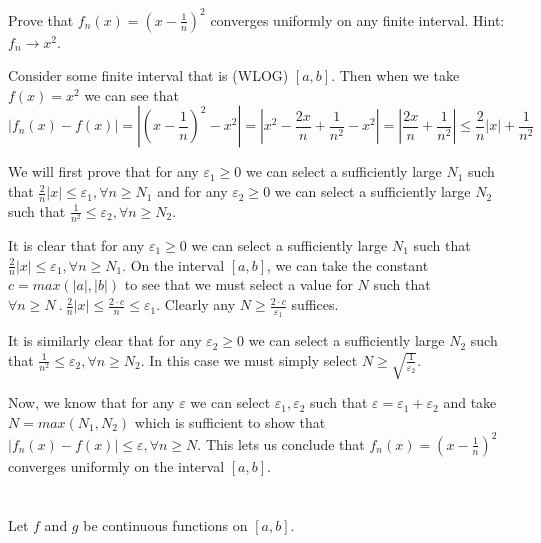 \documentclass[]{article}
\begin{document}
	\section{}
		\begin{em}
			Prove that $f_n(x) = \left ( x - \frac{1}{n} \right ) ^2$ converges uniformly on any finite interval. Hint: $f_n \to x^2$. 
		\end{em}

		Consider some finite interval that is (WLOG) $[a, b]$. Then when we take $f(x) = x^2$ we can see that 
		\[|f_n(x) - f(x)| = \left |\left ( x - \frac{1}{n} \right ) ^2 - x^2 \right | = \left |x^2 - \frac{2x}{n} + \frac{1}{n^2} - x^2 \right | = \left |\frac{2x}{n} + \frac{1}{n^2} \right | \leq \frac{2}{n}|x| + \frac{1}{n^2}\] 

		We will first prove that for any $\varepsilon_1 \geq 0$ we can select a sufficiently large $N_1$ such that $\frac{2}{n}|x| \leq \varepsilon_1, \forall n \geq N_1$ and for any $\varepsilon_2 \geq 0$ we can select a sufficiently large $N_2$ such that $\frac{1}{n^2} \leq \varepsilon_2, \forall n \geq N_2$. 

		It is clear that for any $\varepsilon_1 \geq 0$ we can select a sufficiently large $N_1$ such that $\frac{2}{n}|x| \leq \varepsilon_1, \forall n \geq N_1$. On the interval $[a, b]$, we can take the constant $c = max(|a|, |b|)$ to see that we must select a value for $N$ such that $\forall n \geq N\ .\ \frac{2}{n} |x| \leq \frac{2 \cdot c}{n} \leq \varepsilon_1$. Clearly any $N \geq \frac{2 \cdot c}{\varepsilon_1}$ suffices. 

		It is similarly clear that for any $\varepsilon_2 \geq 0$ we can select a sufficiently large $N_2$ such that $\frac{1}{n^2} \leq \varepsilon_2, \forall n \geq N_2$. In this case we must simply select $N \geq \sqrt{\frac{1}{\varepsilon_2}}$. 

		Now, we know that for any $\varepsilon$ we can select $\varepsilon_1, \varepsilon_2$ such that $\varepsilon = \varepsilon_1 + \varepsilon_2$ and take $N = max(N_1, N_2)$ which is sufficient to show that $|f_n(x) - f(x)| \leq \varepsilon, \forall n \geq N$. This lets us conclude that $f_n(x) = \left ( x - \frac{1}{n} \right ) ^2$ converges uniformly on the interval $[a, b]$. 

	\section{}
		\begin{em}
			Let $f$ and $g$ be continuous functions on $[a, b]$. 
		\end{em}
\end{document}
